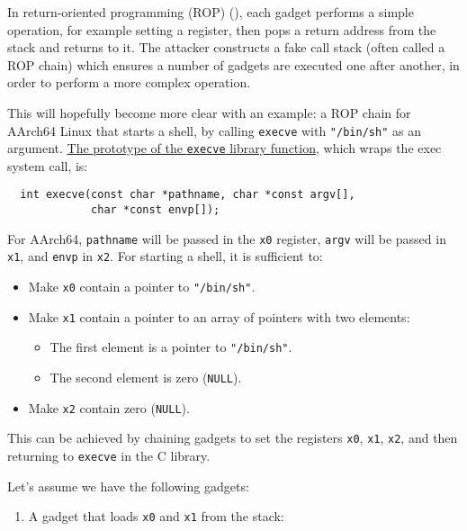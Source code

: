 \documentclass[
  a4paper,
]{report}
\providecommand{\tightlist}{%
  \setlength{\itemsep}{0pt}\setlength{\parskip}{0pt}}
\begin{document}
In \label{__index_entry_16}{return-oriented programming
(ROP)}
(), each gadget performs a
simple operation, for example setting a register, then pops a return
address from the stack and returns to it. The attacker constructs a fake
call stack (often called a \label{__index_entry_17}{ROP
chain}) which ensures a number of gadgets are executed
one after another, in order to perform a more complex operation.

This will hopefully become more clear with an example: a ROP chain for
AArch64 Linux that starts a shell, by calling \texttt{execve} with
\texttt{"/bin/sh"} as an argument.
\href{https://man7.org/linux/man-pages/man2/execve.2.html}{The prototype
of the \texttt{execve} library function}, which wraps the exec system
call, is:

\begin{verbatim}
  int execve(const char *pathname, char *const argv[],
             char *const envp[]);
\end{verbatim}

For AArch64, \texttt{pathname} will be passed in the \texttt{x0}
register, \texttt{argv} will be passed in \texttt{x1}, and \texttt{envp}
in \texttt{x2}. For starting a shell, it is sufficient to:

\begin{itemize}
\tightlist
\item
  Make \texttt{x0} contain a pointer to \texttt{"/bin/sh"}.
\item
  Make \texttt{x1} contain a pointer to an array of pointers with two
  elements:

  \begin{itemize}
  \tightlist
  \item
    The first element is a pointer to \texttt{"/bin/sh"}.
  \item
    The second element is zero (\texttt{NULL}).
  \end{itemize}
\item
  Make \texttt{x2} contain zero (\texttt{NULL}).
\end{itemize}

This can be achieved by chaining gadgets to set the registers
\texttt{x0}, \texttt{x1}, \texttt{x2}, and then returning to
\texttt{execve} in the C library.

Let's assume we have the following gadgets:

\begin{enumerate}
\def\labelenumi{\arabic{enumi}.}
\tightlist
\item
  A gadget that loads \texttt{x0} and \texttt{x1} from the stack:
\end{enumerate}
\end{document}
